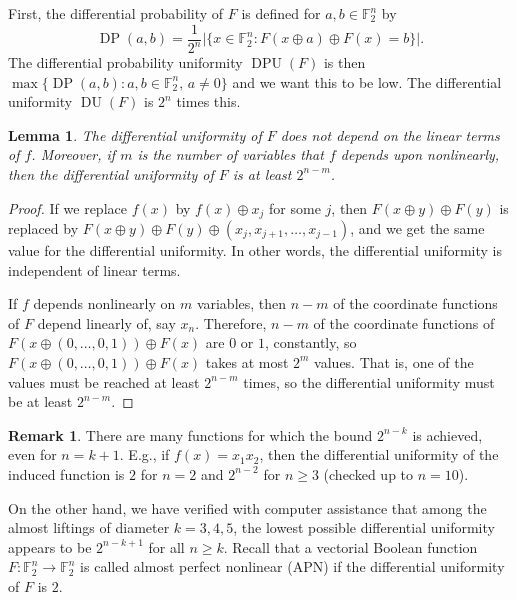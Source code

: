 \documentclass[11pt,english,a4paper]{amsart}
\theoremstyle{plain}
\newtheorem{lemma}[theorem]{Lemma}
\theoremstyle{definition}
\newtheorem{remark}[theorem]{Remark}
\theoremstyle{remark}
\newcommand{\F}{\mathbb{F}}
\begin{document}
	
	\medskip
	
	First, the differential probability of $F$ is defined for $a,b\in\F_2^n$ by
	\[
	\operatorname{DP}(a,b)=\frac{1}{2^n}\lvert\{ x\in\F_2^n : F(x\oplus a)\oplus F(x)=b \}\rvert.
	\]
	The differential probability uniformity $\operatorname{DPU}(F)$ is then $\max\{ \operatorname{DP}(a,b) : a,b\in\F_2^n,\, a\neq 0 \}$ and we want this to be low. The differential uniformity $\operatorname{DU}(F)$ is $2^n$ times this.

\begin{lemma}
    The differential uniformity of $F$ does not depend on the linear terms of $f$. Moreover, if $m$ is the number of variables that $f$ depends upon nonlinearly, then the differential uniformity of $F$ is at least $2^{n-m}$.
\end{lemma}

\begin{proof}
    If we replace $f(x)$ by $f(x) \oplus x_j$ for some $j$, then $F(x \oplus y) \oplus F(y)$ is replaced by $F(x \oplus y) \oplus F(y) \oplus \left(x_j, x_{j + 1}, \dotsc, x_{j - 1} \right)$, and we get the same value for the differential uniformity. In other words, the differential uniformity is independent of linear terms.

    If $f$ depends nonlinearly on $m$ variables, then $n-m$ of the coordinate functions of $F$ depend linearly of, say $x_n$. Therefore, $n-m$ of the coordinate functions of $F(x\oplus (0,\dotsc,0,1))\oplus F(x)$ are $0$ or $1$, constantly, so $F(x\oplus (0,\dotsc,0,1))\oplus F(x)$ takes at most $2^m$ values. That is, one of the values must be reached at least $2^{n-m}$ times, so the differential uniformity must be at least $2^{n-m}$.   
\end{proof}


\begin{remark}\label{apn-lifting}
        There are many functions for which the bound $2^{n-k}$ is achieved, even for $n=k+1$. E.g., if $f(x)=x_1x_2$, then the differential uniformity of the induced function is $2$ for $n=2$ and $2^{n-2}$ for $n \geq 3$ (checked up to $n = 10$).
        
		On the other hand, we have verified with computer assistance that among the almost liftings of diameter $k=3,4,5$, the lowest possible differential uniformity appears to be $2^{n-k+1}$ for all $n\geq k$. Recall that a vectorial Boolean function $F\colon\F_2^n \to \F_2^n$ is called almost perfect nonlinear (APN) if the differential uniformity of $F$ is $2$.
\end{remark}
\end{document}

